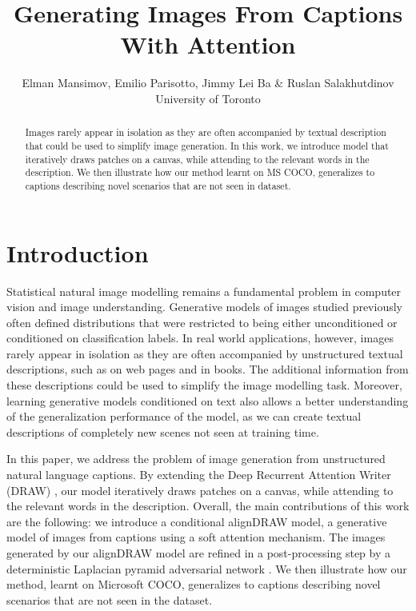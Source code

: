 \documentclass{article} %
\title{Generating Images From Captions With Attention}
\author{
Elman Mansimov, Emilio Parisotto, Jimmy Lei Ba \& Ruslan Salakhutdinov\\
University of Toronto\\
}
\newcommand{\comm}[1]{}
\begin{document}
\maketitle
\vspace*{-0.4cm}
\begin{abstract}
\vspace*{-0.15cm}
Images rarely appear in isolation as they are often accompanied by textual description that could be used to simplify image generation. In this work, we introduce model that iteratively draws patches on a canvas, while attending to the relevant words in the description. We then illustrate how our method learnt on MS COCO, generalizes to captions describing novel scenarios that are not seen in dataset.
\end{abstract} 

\vspace{-0.1in}
\section{Introduction}
Statistical natural image modelling remains a fundamental problem in computer vision and image understanding.
Generative models of images studied previously often defined distributions that were restricted to being either unconditioned or conditioned on classification labels. In real world applications, however, images rarely appear in isolation as they are often accompanied by unstructured textual descriptions, such as on web pages and in books. 
The additional information from these descriptions could be used to simplify the image modelling task. Moreover, learning generative models conditioned on text also allows a better understanding of the generalization performance of the model, as we can create textual descriptions of completely new scenes not seen at training time. 

\comm{
Significant amount of recent works has been focused on generating captions from images \citep{karpathy_captions}, \citep{xu_captions}, \citep{kiros_captions} and etc. By contrast, image understanding may also be studied by generating images correctly interpreting the text description. 
Generating high dimensional realistic images from their descriptions is a more difficult approach that combines two challenging components of language modelling and image generation.  
}

In this paper, we address the problem of image generation from unstructured natural language captions. By extending the Deep Recurrent Attention Writer (DRAW) \cite{gregor_draw}, our model iteratively draws patches on a canvas, while attending to the relevant words in the description. Overall, the main contributions of this work are the following: we introduce a conditional alignDRAW model, a generative model of images from captions using a soft attention mechanism. The images generated by our alignDRAW model are refined in a post-processing step by a deterministic Laplacian pyramid adversarial network \cite{denton_lapgan}. We then illustrate how our method, learnt on Microsoft COCO, generalizes to captions describing novel scenarios that are not seen in the dataset. 
\end{document}
